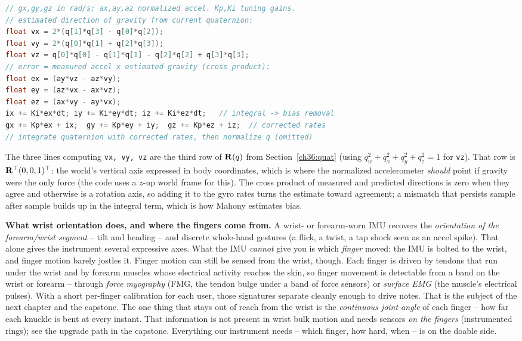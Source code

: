 \begin{lstlisting}[language=C,caption={Mahony-style correction core (per loop, quaternion q[4]).}]
// gx,gy,gz in rad/s; ax,ay,az normalized accel. Kp,Ki tuning gains.
// estimated direction of gravity from current quaternion:
float vx = 2*(q[1]*q[3] - q[0]*q[2]);
float vy = 2*(q[0]*q[1] + q[2]*q[3]);
float vz = q[0]*q[0] - q[1]*q[1] - q[2]*q[2] + q[3]*q[3];
// error = measured accel x estimated gravity (cross product):
float ex = (ay*vz - az*vy);
float ey = (az*vx - ax*vz);
float ez = (ax*vy - ay*vx);
ix += Ki*ex*dt; iy += Ki*ey*dt; iz += Ki*ez*dt;   // integral -> bias removal
gx += Kp*ex + ix;  gy += Kp*ey + iy;  gz += Kp*ez + iz;  // corrected rates
// integrate quaternion with corrected rates, then normalize q (omitted)
\end{lstlisting}

The three lines computing \texttt{vx, vy, vz} are the third row of $\mathbf{R}(q)$ from
Section~\ref{ch36:quat} (using $q_w^2+q_x^2+q_y^2+q_z^2=1$ for \texttt{vz}). That row is
$\mathbf{R}^\top(0,0,1)^\top$: the world's vertical axis expressed in body coordinates, which
is where the normalized accelerometer \emph{should} point if gravity were the only force
(the code uses a $z$-up world frame for this). The cross product of measured and
predicted directions is zero when they agree and otherwise is a rotation axis, so adding
it to the gyro rates turns the estimate toward agreement; a mismatch that persists sample
after sample builds up in the integral term, which is how Mahony estimates bias.

\begin{trapbox}
\textbf{What wrist orientation does, and where the fingers come from.} A wrist- or
forearm-worn IMU recovers the \emph{orientation of the forearm/wrist segment} -- tilt and
heading -- and discrete whole-hand gestures (a flick, a twist, a tap shock seen as an
accel spike). That alone gives the instrument several expressive axes. What the IMU
\emph{cannot} give you is which \emph{finger} moved: the IMU is bolted to the wrist, and
finger motion barely jostles it. Finger motion can still be sensed from the wrist, though. Each finger
is driven by tendons that run under the wrist and by forearm muscles whose electrical
activity reaches the skin, so finger movement is detectable from a band on the
wrist or forearm -- through \emph{force myography} (FMG, the tendon bulge under a band of
force sensors) or \emph{surface EMG} (the muscle's electrical pulses). With a short
per-finger calibration for each user, those signatures separate cleanly enough to drive
notes. That is the subject of the next chapter and the capstone. The one thing that
stays out of reach from the wrist is the \emph{continuous joint angle} of each finger --
how far each knuckle is bent at every instant. That information is not present in wrist
bulk motion and needs sensors \emph{on the fingers} (instrumented rings); see the
upgrade path in the capstone. Everything our instrument needs -- which finger,
how hard, when -- is on the doable side.
\end{trapbox}

